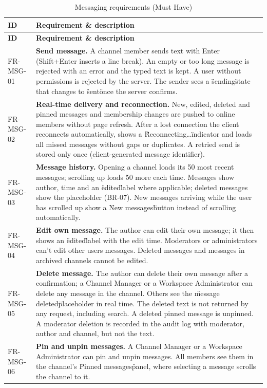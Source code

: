 \documentclass[
    english, %
]{VUMIFPSkursinis}
\newcommand{\frhead}{\textbf{ID} & \textbf{Requirement \& description} \\ \hline}
\begin{document}

\begin{longtable}{|p{}|p{}|}
\caption{Messaging requirements (Must Have)}\\ \hline
\frhead
\endfirsthead
\hline \frhead
\endhead
FR-MSG-01 & \textbf{Send message.} A channel member sends text with Enter (Shift+Enter inserts a line break). An empty or too long message is rejected with an error and the typed text is kept. A user without permissions is rejected by the server. The sender sees a \"sending\" state that changes to \"sent\" once the server confirms. \\ \hline
FR-MSG-02 & \textbf{Real-time delivery and reconnection.} New, edited, deleted and pinned messages and membership changes are pushed to online members without page refresh. After a lost connection the client reconnects automatically, shows a \"Reconnecting\ldots\" indicator and loads all missed messages without gaps or duplicates. A retried send is stored only once (client-generated message identifier). \\ \hline
FR-MSG-03 & \textbf{Message history.} Opening a channel loads its 50 most recent messages; scrolling up loads 50 more each time. Messages show author, time and an \"edited\" label where applicable; deleted messages show the placeholder (BR-07). New messages arriving while the user has scrolled up show a \"New messages\" button instead of scrolling automatically. \\ \hline
FR-MSG-04 & \textbf{Edit own message.} The author can edit their own message; it then shows an \"edited\" label with the edit time. Moderators or administrators can't edit other users messages. Deleted messages and messages in archived channels cannot be edited. \\ \hline
FR-MSG-05 & \textbf{Delete message.} The author can delete their own message after a confirmation; a Channel Manager or a Workspace Administrator can delete any message in the channel. Others see the \"message deleted\" placeholder in real time. The deleted text is not returned by any request, including search. A deleted pinned message is unpinned. A moderator deletion is recorded in the audit log with moderator, author and channel, but not the text. \\ \hline
FR-MSG-06 & \textbf{Pin and unpin messages.} A Channel Manager or a Workspace Administrator can pin and unpin messages. All members see them in the channel's \"Pinned messages\" panel, where selecting a message scrolls the channel to it. \\ \hline

\end{longtable}
\end{document}
